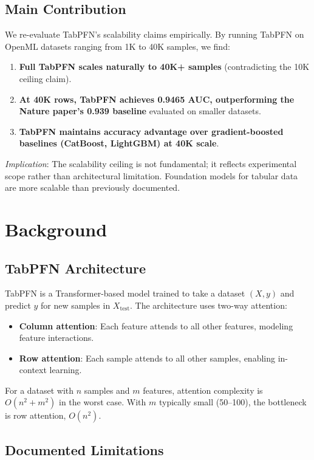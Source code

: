\documentclass[11pt,a4paper]{article}
\begin{document}
\subsection{Main Contribution}

We re-evaluate TabPFN's scalability claims empirically. By running TabPFN on OpenML datasets ranging from 1K to 40K samples, we find:

\begin{enumerate}
\item \textbf{Full TabPFN scales naturally to 40K+ samples} (contradicting the 10K ceiling claim).
\item \textbf{At 40K rows, TabPFN achieves 0.9465 AUC, outperforming the Nature paper's 0.939 baseline} evaluated on smaller datasets.
\item \textbf{TabPFN maintains accuracy advantage over gradient-boosted baselines (CatBoost, LightGBM) at 40K scale}.
\end{enumerate}

\emph{Implication}: The scalability ceiling is not fundamental; it reflects experimental scope rather than architectural limitation. Foundation models for tabular data are more scalable than previously documented.

\section{Background}

\subsection{TabPFN Architecture}

TabPFN is a Transformer-based model trained to take a dataset $(X, y)$ and predict $y$ for new samples in $X_{\text{test}}$. The architecture uses two-way attention:
\begin{itemize}
\item \textbf{Column attention}: Each feature attends to all other features, modeling feature interactions.
\item \textbf{Row attention}: Each sample attends to all other samples, enabling in-context learning.
\end{itemize}

For a dataset with $n$ samples and $m$ features, attention complexity is $O(n^2 + m^2)$ in the worst case. With $m$ typically small (50--100), the bottleneck is row attention, $O(n^2)$.

\subsection{Documented Limitations}
\end{document}
